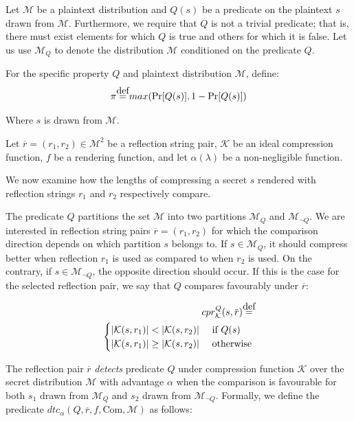 Let $\mathcal{M}$ be a plaintext distribution and $Q(s)$ be a predicate on the
plaintext $s$ drawn from $\mathcal{M}$. Furthermore, we require that $Q$ is not a
trivial predicate; that is, there must exist elements for which $Q$ is true and
others for which it is false.  Let us use $\mathcal{M}_Q$ to denote the
distribution $\mathcal{M}$ conditioned on the predicate $Q$.

For the specific property $Q$ and plaintext distribution $\mathcal{M}$, define:
\begin{equation*}
    \pi \defeq max(\Pr[Q(s)], 1 - \Pr[Q(s)])
\end{equation*}

Where $s$ is drawn from $\mathcal{M}$.

Let $\overbar{r} = (r_1, r_2) \in \mathcal{M}^2$ be a reflection string pair,
$\mathcal{K}$ be an ideal compression function, $f$ be a rendering function, and
let $\alpha(\lambda)$ be a non-negligible function.

We now examine how the lengths of compressing a secret $s$ rendered with
reflection strings $r_1$ and $r_2$ respectively compare.

The predicate $Q$ partitions the set $\mathcal{M}$ into two partitions
$\mathcal{M}_Q$ and $\mathcal{M}_{\lnot Q}$. We are interested in reflection
string pairs $\overbar{r} = (r_1, r_2)$ for which the comparison direction
depends on which partition $s$ belongs to.  If $s \in \mathcal{M}_Q$, it should
compress better when reflection $r_1$ is used as compared to when $r_2$ is used.
On the contrary, if $s \in \mathcal{M}_{\lnot Q}$, the opposite direction should
occur.  If this is the case for the selected reflection pair, we say that $Q$
compares favourably under $\overbar{r}$:

\begin{equation*}
\begin{split}
    cpr^Q_{\mathcal{K}}(s, \overbar{r})
    \defeq\\
    \begin{cases}
        |\mathcal{K}(s, r_1)| < |\mathcal{K}(s, r_2)| &\text{ if } Q(s)\\
        |\mathcal{K}(s, r_1)| \geq |\mathcal{K}(s, r_2)| &\text{ otherwise}
    \end{cases}
\end{split}
\end{equation*}

The reflection pair $\overbar{r}$ \textit{detects} predicate $Q$ under
compression function $\mathcal{K}$ over the secret distribution $\mathcal{M}$ with
advantage $\alpha$ when the comparison is favourable for both $s_1$ drawn from
$\mathcal{M}_Q$ and $s_2$ drawn from $\mathcal{M}_{\lnot Q}$. Formally, we
define the predicate $dtc_\alpha(Q, \overbar{r}, f, \textrm{Com}, \mathcal{M})$
as follows:

